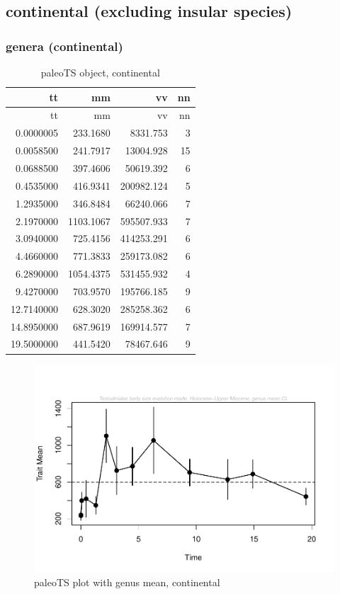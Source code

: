 \documentclass[]{article}
\begin{document}
\newpage

\subsection{continental (excluding insular
species)}\label{continental-excluding-insular-species}

\subsubsection{genera (continental)}\label{genera-continental}

\begin{longtable}[]{@{}rrrr@{}}
\caption{paleoTS object, continental}\tabularnewline
\toprule
tt & mm & vv & nn\tabularnewline
\midrule
\endfirsthead
\toprule
tt & mm & vv & nn\tabularnewline
\midrule
\endhead
0.0000005 & 233.1680 & 8331.753 & 3\tabularnewline
0.0058500 & 241.7917 & 13004.928 & 15\tabularnewline
0.0688500 & 397.4606 & 50619.392 & 6\tabularnewline
0.4535000 & 416.9341 & 200982.124 & 5\tabularnewline
1.2935000 & 346.8484 & 66240.066 & 7\tabularnewline
2.1970000 & 1103.1067 & 595507.933 & 7\tabularnewline
3.0940000 & 725.4156 & 414253.291 & 6\tabularnewline
4.4660000 & 771.3833 & 259173.082 & 6\tabularnewline
6.2890000 & 1054.4375 & 531455.932 & 4\tabularnewline
9.4270000 & 703.9570 & 195766.185 & 9\tabularnewline
12.7140000 & 628.3020 & 285258.362 & 6\tabularnewline
14.8950000 & 687.9619 & 169914.577 & 7\tabularnewline
19.5000000 & 441.5420 & 78467.646 & 9\tabularnewline
\bottomrule
\end{longtable}

\begin{figure}[htbp]
\centering
\includegraphics{MA_JJ_files/figure-latex/paleoTSC-1.pdf}
\caption{paleoTS plot with genus mean, continental}
\end{figure}
\end{document}
